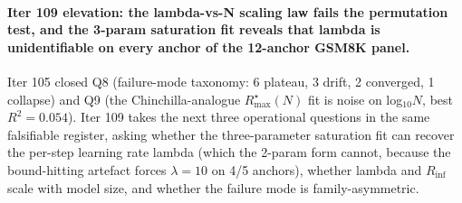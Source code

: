 %
%
\paragraph{Iter 109 elevation: the lambda-vs-N scaling law fails the permutation test, and the 3-param saturation fit reveals that lambda is unidentifiable on every anchor of the 12-anchor GSM8K panel.}
\label{par:scaling-iter109}

Iter 105 closed Q8 (failure-mode taxonomy: 6 plateau, 3 drift, 2 converged, 1 collapse) and Q9 (the Chinchilla-analogue $R_\mathrm{max}^\star(N)$ fit is noise on log$_{10}N$, best $R^2 = 0.054$).  Iter 109 takes the next three operational questions in the same falsifiable register, asking whether the three-parameter saturation fit can recover the per-step learning rate lambda (which the 2-param form cannot, because the bound-hitting artefact forces $\lambda = 10$ on 4/5 anchors), whether lambda and $R_\mathrm{inf}$ scale with model size, and whether the failure mode is family-asymmetric.

